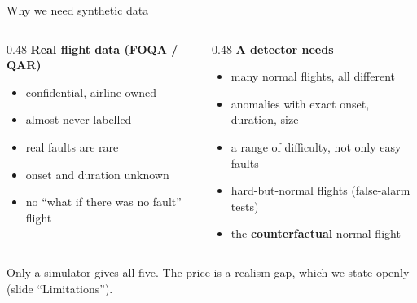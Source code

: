 \documentclass[aspectratio=169,11pt]{beamer}
\begin{document}
\begin{frame}{Why we need synthetic data}
  \begin{columns}[T]
    \begin{column}{0.48\textwidth}
      \textbf{Real flight data (FOQA / QAR)}
      \begin{itemize}
        \item confidential, airline-owned
        \item almost never labelled
        \item real faults are rare
        \item onset and duration unknown
        \item no ``what if there was no fault'' flight
      \end{itemize}
    \end{column}
    \begin{column}{0.48\textwidth}
      \textbf{A detector needs}
      \begin{itemize}
        \item many normal flights, all different
        \item anomalies with exact onset, duration, size
        \item a range of difficulty, not only easy faults
        \item hard-but-normal flights (false-alarm tests)
        \item the \textbf{counterfactual} normal flight
      \end{itemize}
    \end{column}
  \end{columns}
  \vspace{1.2em}
  \begin{block}{}
    Only a simulator gives all five. The price is a realism gap, which we state openly (slide ``Limitations'').
  \end{block}
\end{frame}
\end{document}
